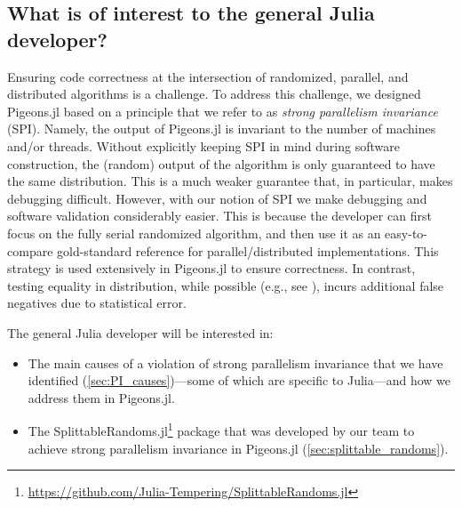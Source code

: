 \subsection{What is of interest to the general Julia developer?}
Ensuring code correctness at the intersection of randomized, parallel, and 
distributed algorithms is a challenge. To address this challenge, we designed Pigeons.jl 
based on a principle that we refer to as \textit{strong parallelism invariance}
(SPI).
Namely, the output of Pigeons.jl is  invariant to the number of machines 
and/or threads.
Without explicitly keeping SPI in mind during software construction, 
the (random) output of the algorithm is only guaranteed to have the same distribution.
This is a much weaker guarantee that, in particular, makes debugging difficult.
However, with our notion of SPI we make debugging and 
software validation considerably easier. This is because the developer can 
first focus on the fully serial randomized algorithm, and then use it as an 
easy-to-compare gold-standard reference for parallel/distributed implementations. 
This strategy is used extensively in Pigeons.jl to ensure correctness. In contrast, 
testing equality in distribution, while possible (e.g., see \cite{geweke2004getting}), 
incurs additional false negatives due to statistical error.

\medskip 
The general Julia developer will be interested in: 
\begin{itemize}
    \item The main causes of a violation of strong parallelism invariance that we have identified 
    (\cref{sec:PI_causes})---some of which are specific to Julia---and how we address 
    them in Pigeons.jl.

    \item The SplittableRandoms.jl\footnote{\url{https://github.com/Julia-Tempering/SplittableRandoms.jl}}
    package that was developed by our team 
    to achieve strong parallelism invariance in Pigeons.jl (\cref{sec:splittable_randoms}).
\end{itemize}
